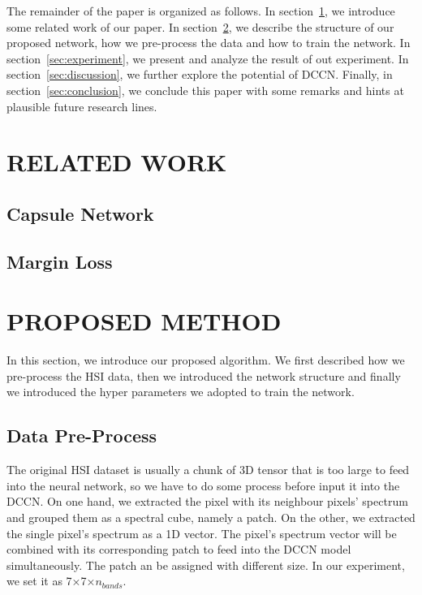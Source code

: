 \documentclass{article}
\begin{document}
	The remainder of the paper is organized as follows.
	In section~\ref{sec:related-works}, we introduce some related work of our paper.
	In section~\ref{sec:proposed-method}, we describe the structure of our proposed network, how we pre-process the data
	and how to train the network.
	In section~\ref{sec:experiment}, we present and analyze the result of out experiment.
	In section~\ref{sec:discussion}, we further explore the potential of DCCN\@.
	Finally, in section~\ref{sec:conclusion}, we conclude this paper with some remarks and hints at plausible future
	research lines.


	\section{RELATED WORK}\label{sec:related-works}

	\subsection{Capsule Network}\label{subsec:capsule-network}

	\subsection{Margin Loss}\label{subsec:margin-loss}


	\section{PROPOSED METHOD}\label{sec:proposed-method}

	In this section, we introduce our proposed algorithm.
	We first described how we pre-process the HSI data, then we introduced the network structure and finally we
	introduced the hyper parameters we adopted to train the network.

	\subsection{Data Pre-Process}\label{subsec:data-pre-process}
	The original HSI dataset is usually a chunk of 3D tensor that is too large to feed into the neural network, so we
	have to do some process before input it into the DCCN\@.
	On one hand, we extracted the pixel with its neighbour pixels' spectrum and grouped them as a spectral cube, namely
	a patch.
	On the other, we extracted the single pixel's spectrum as a 1D vector.
	The pixel's spectrum vector will be combined with its corresponding patch to feed into the DCCN model simultaneously.
	The patch an be assigned with different size.
	In our experiment, we set it as 7×7×$n_{bands}$.
\end{document}
